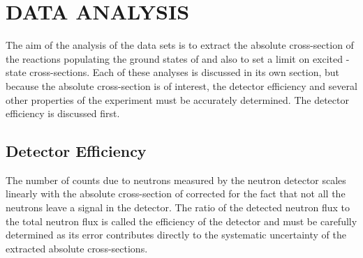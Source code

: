 %
%
%
%
%
%
%
%

%
%

\chapter{DATA ANALYSIS}
\label{chap:dataAnalysis}

The aim of the analysis of the \reaction data sets is to extract the absolute cross-section of the reactions populating the ground states of \SeProducts and also to set a limit on excited \zp-state cross-sections.  Each of these analyses is discussed in its own section, but because the absolute cross-section is of interest, the detector efficiency and several other properties of the experiment must be accurately determined.  The detector efficiency is discussed first.

\section{Detector Efficiency}

\label{sec:efficiency}
The number of counts due to neutrons measured by the neutron detector scales linearly with the absolute cross-section of \reaction corrected for the fact that not all the neutrons leave a signal in the detector.  The ratio of the detected neutron flux to the total neutron flux is called the efficiency of the detector and must be carefully determined as its error contributes directly to the systematic uncertainty of the extracted absolute cross-sections.

